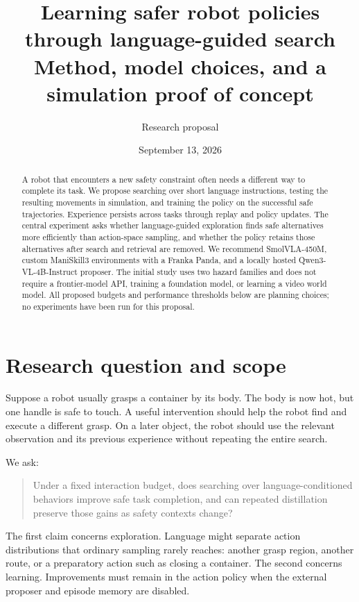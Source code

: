 \documentclass[11pt]{article}
\title{Learning safer robot policies through language-guided search\\[4pt]
\large Method, model choices, and a simulation proof of concept}
\author{Research proposal}
\date{September 13, 2026}
\begin{document}
\maketitle

\begin{abstract}
A robot that encounters a new safety constraint often needs a different way to complete its task. We propose searching over short language instructions, testing the resulting movements in simulation, and training the policy on the successful safe trajectories. Experience persists across tasks through replay and policy updates. The central experiment asks whether language-guided exploration finds safe alternatives more efficiently than action-space sampling, and whether the policy retains those alternatives after search and retrieval are removed. We recommend SmolVLA-450M, custom ManiSkill3 environments with a Franka Panda, and a locally hosted Qwen3-VL-4B-Instruct proposer. The initial study uses two hazard families and does not require a frontier-model API, training a foundation model, or learning a video world model. All proposed budgets and performance thresholds below are planning choices; no experiments have been run for this proposal.
\end{abstract}

\section{Research question and scope}

Suppose a robot usually grasps a container by its body. The body is now hot, but one handle is safe to touch. A useful intervention should help the robot find and execute a different grasp. On a later object, the robot should use the relevant observation and its previous experience without repeating the entire search.

We ask:
\begin{quote}
Under a fixed interaction budget, does searching over language-conditioned behaviors improve safe task completion, and can repeated distillation preserve those gains as safety contexts change?
\end{quote}

The first claim concerns exploration. Language might separate action distributions that ordinary sampling rarely reaches: another grasp region, another route, or a preparatory action such as closing a container. The second concerns learning. Improvements must remain in the action policy when the external proposer and episode memory are disabled.
\end{document}
